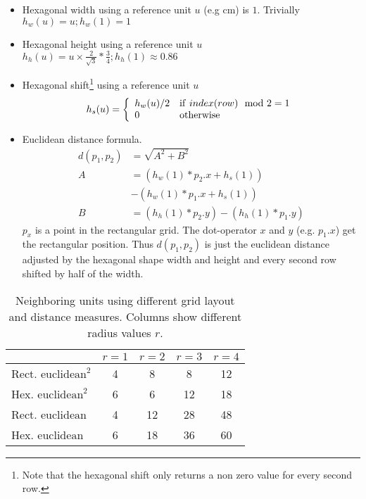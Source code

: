 \documentclass{acm_proc_article-sp}
\begin{document}
\begin{itemize}
    \item Hexagonal width using a reference unit $u$ (e.g cm) is $1$. Trivially
        $ h_w(u) = u; h_w(1) = 1 $
    \item Hexagonal height using a reference unit $u$ \\
        $ h_h(u) = u \times \frac{2}{\sqrt{3}} * \frac{3}{4}; h_h(1) \approx 0.86 $
    \item Hexagonal shift\footnote{Note that the hexagonal shift only returns a non zero
    	value for every second row.} using a reference unit $u$ \\
        \[ h_s(u) = \left\{
               \begin{array} {l l}
                   h_w(u)/2 & \mathrm{if}\ index(row)\mod 2 = 1 \\
                   0 & \mathrm{otherwise}
               \end{array}
               \right.\]

    \item Euclidean distance formula.
    \begin{align*}
        d(p_1,p_2) & = \sqrt{ A^2 + B^2 }\\
        A & = (h_w(1) * p_2.x + h_s(1)) \\
          &- (h_w(1) * p_1.x + h_s(1))\\
        B & = (h_h(1) * p_2.y) - (h_h(1) * p_1.y)
    \end{align*}
    $p_x$ is a point in the rectangular grid. The dot-operator $x$ and $y$
    (e.g. $p_1.x$) get the rectangular position. Thus $d(p_1,p_2)$ is just the
    euclidean distance adjusted by the hexagonal shape width and height
    and every second row shifted by half of the width.
\end{itemize}

\begin{table}
	\centering
	\begin{tabular}{|l|c|c|c|c|}
		\hline
		  & $r=1$& $r=2$ & $r=3$ & $r=4$ \\
		\hline
		Rect. $\mathrm{euclidean}^2$ & 4 & 8 & 8 & 12 \\
		\hline
		Hex. $\mathrm{euclidean}^2$ & 6 & 6 & 12 & 18 \\
		\hline
		\hline
		Rect. $\mathrm{euclidean}$ & 4 & 12 &  28 & 48 \\
		\hline
		Hex. $\mathrm{euclidean}$ & 6 & 18 & 36 & 60 \\
		\hline
	\end{tabular}
	\caption{Neighboring units using different grid layout and distance measures. Columns show different radius values $r$.}
	\label{tab:neighbors}
\end{table}
\end{document}
